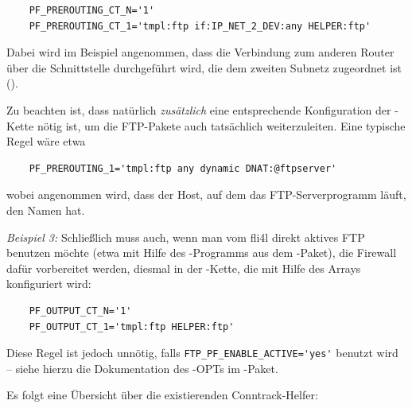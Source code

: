 \begin{example}
\begin{verbatim}
    PF_PREROUTING_CT_N='1'
    PF_PREROUTING_CT_1='tmpl:ftp if:IP_NET_2_DEV:any HELPER:ftp'
\end{verbatim}
\end{example}

  Dabei wird im Beispiel angenommen, dass die Verbindung zum anderen Router
  über die Schnittstelle durchgeführt wird, die dem zweiten Subnetz zugeordnet
  ist ().
  
  Zu beachten ist, dass natürlich \emph{zusätzlich} eine entsprechende
  Konfiguration der -Kette nötig ist, um die FTP-Pakete auch
  tatsächlich weiterzuleiten. Eine typische Regel wäre etwa
  
\begin{example}
\begin{verbatim}
    PF_PREROUTING_1='tmpl:ftp any dynamic DNAT:@ftpserver'
\end{verbatim}
\end{example}

  wobei angenommen wird, dass der Host, auf dem das FTP-Serverprogramm läuft,
  den Namen  hat.

  \emph{Beispiel 3:} Schließlich muss auch, wenn man vom fli4l direkt aktives
  FTP benutzen möchte (etwa mit Hilfe des -Programms aus dem
  -Paket), die Firewall dafür vorbereitet werden, diesmal in der
  -Kette, die mit Hilfe des Arrays 
  konfiguriert wird:
  
\begin{example}
\begin{verbatim}
    PF_OUTPUT_CT_N='1'
    PF_OUTPUT_CT_1='tmpl:ftp HELPER:ftp'
\end{verbatim}
\end{example}

  Diese Regel ist jedoch unnötig, falls \verb+FTP_PF_ENABLE_ACTIVE='yes'+
  benutzt wird -- siehe hierzu die Dokumentation des -OPTs im
  -Paket.

  Es folgt eine Übersicht über die existierenden Conntrack-Helfer:

